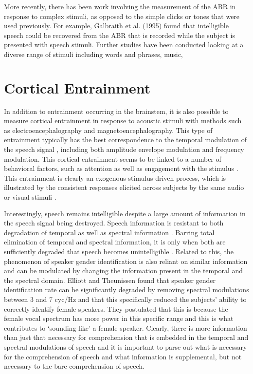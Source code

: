 \documentclass[titlepage]{article}
\begin{document}
    More recently, there has been work involving the measurement of the ABR in response to complex
    stimuli, as opposed to the simple clicks or tones that were used previously.
    For example, Galbraith et al. (1995) \cite{Galbraith1995} found that intelligible
    speech could be recovered from the ABR that is recorded while the subject is presented with
    speech stimuli. Further studies have been conducted looking at a diverse range of stimuli
    including words and phrases, music,

\section{Cortical Entrainment}

  In addition to entrainment occurring in the brainstem, it is also possible to measure cortical
  entrainment in response to acoustic stimuli with methods such as electroencephalography and
  magnetoencephalography. This type of entrainment typically has the best correspondence to the
  temporal modulation of the speech signal \cite{Ding2014a,Ding2014,Nourski2009,Horton2014},
  including both amplitude envelope modulation and frequency modulation. This cortical entrainment
  seems to be linked to a number of behavioral factors, such as attention
  \cite{Dmochowski2016,ZionGolumbic2013} as well as engagement with the stimulus \cite{Dmochowski2017}.
  This entrainment is clearly an exogenous stimulus-driven process, which is illustrated by the
  consistent responses elicited across subjects by the same audio or visual stimuli
  \cite{Cohen2017,Petroni2017}.

  Interestingly, speech remains intelligible despite a large amount of information in the speech
  signal being destroyed. Speech information is resistant to both degradation of temporal as well
  as spectral information \cite{Silipo1999,Drullman1994}. Barring total elimination of temporal
  and spectral information, it is only when both are sufficiently degraded that speech becomes
  unintelligible \cite{Elliott2009}. Related to this, the phenomenon of speaker gender identification
  is also reliant on similar information and can be modulated by changing the information present
  in the temporal and the spectral domain. Elliott and Theunissen \cite{Elliott2009} found that speaker
  gender identification rate can be significantly degraded by removing spectral modulations between 3 and
  7 cyc/Hz and that this specifically reduced the subjects' ability to correctly identify female speakers.
  They postulated that this is because the female vocal spectrum has more power in this specific range and
  this is what contributes to `sounding like' a female speaker. Clearly, there is more information than
  just that necessary for comprehension that is embedded in the temporal and spectral modulations of speech
  and it is important to parse out what is necessary for the comprehension of speech and what information
  is supplemental, but not necessary to the bare comprehension of speech.
\end{document}
